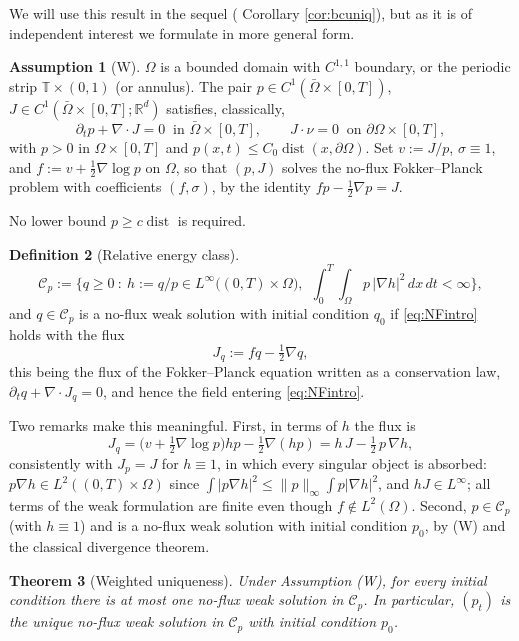 \documentclass[11pt]{amsart}
\newtheorem{theorem}{Theorem}[section]
\theoremstyle{definition}
\newtheorem{definition}[theorem]{Definition}
\newtheorem{assumption}[theorem]{Assumption}
\newcommand{\dive}{\nabla\!\cdot}
\newcommand{\R}{\mathbb{R}}
\newcommand{\T}{\mathbb{T}}
\newcommand{\dd}{\,d}
\begin{document}
We will use this result in the sequel (
Corollary \ref{cor:bcuniq}), but as it is of independent interest we formulate in more general form.
\begin{assumption}[W]\label{ass:W}
$\Omega$ is a bounded domain with $C^{1,1}$ boundary, or the
periodic strip $\T\times(0,1)$ (or annulus). The pair
$p\in C^1(\bar\Omega\times[0,T])$,
$J\in C^1(\bar\Omega\times[0,T];\R^d)$ satisfies, classically,
\[
\partial_tp+\dive J=0\ \text{ in }\bar\Omega\times[0,T],\qquad
J\cdot\nu=0\ \text{ on }\partial\Omega\times[0,T],
\]
with $p>0$ in $\Omega\times[0,T]$ and
$p(x,t)\le C_0\operatorname{dist}(x,\partial\Omega)$. Set $v:=J/p$,
$\sigma\equiv1$, and $f:=v+\tfrac12\nabla\log p$ on $\Omega$, so
that $(p,J)$ solves the no-flux Fokker--Planck problem with
coefficients $(f,\sigma)$, by the identity $fp-\tfrac12\nabla p=J$.
\end{assumption}
No lower bound  $p\ge c\operatorname{dist}$ is required.

\begin{definition}[Relative energy class]\label{def:relclass}
\[
\mathcal{C}_p:=\Big\{q\ge0\ :\ h:=q/p\in
L^\infty\big((0,T)\times\Omega\big),\ \
\int_0^T\!\!\int_\Omega p\,|\nabla h|^2\dd x\dd t<\infty\Big\},
\]
and $q\in\mathcal{C}_p$ is a no-flux weak solution with initial condition $q_0$
if \eqref{eq:NFintro} holds with the flux
\[
J_q:=fq-\tfrac12\nabla q,
\]
this being the flux of the Fokker--Planck equation written as a
conservation law, $\partial_tq+\dive J_q=0$, and hence the field
entering \eqref{eq:NFintro}.
\end{definition}

Two remarks make this meaningful. First, in terms of $h$ the flux is
\begin{equation}\label{eq:fluxid}
J_q=\big(v+\tfrac12\nabla\log p\big)hp-\tfrac12\nabla(hp)
=h\,J-\tfrac12\,p\,\nabla h,
\end{equation}
consistently with $J_p=J$ for $h\equiv1$,
in which every singular object is absorbed:
$p\nabla h\in L^2((0,T)\times\Omega)$ since
$\int|p\nabla h|^2\le\|p\|_\infty\int p|\nabla h|^2$, and
$hJ\in L^\infty$; all terms of the weak formulation are finite even
though $f\notin L^2(\Omega)$. Second,
$p\in\mathcal{C}_p$ (with $h\equiv1$) and is a no-flux weak solution
with initial condition $p_0$, by (W) and the classical divergence theorem.

\begin{theorem}[Weighted uniqueness]\label{thm:weighted}
Under Assumption \textup{(W)}, for every initial condition there is at
most one no-flux weak solution in $\mathcal{C}_p$. In particular,
$(p_t)$ is the unique no-flux weak solution in $\mathcal{C}_p$ with
initial condition $p_0$.
\end{theorem}
\end{document}
